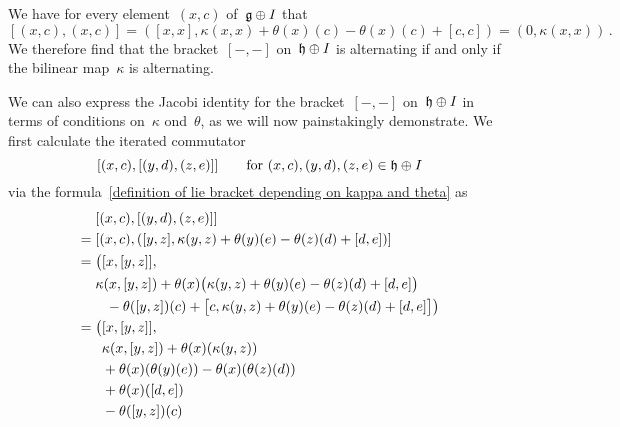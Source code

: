 \begin{fluff}
\begin{enumerate}
      We have for every element~$(x,c)$ of~$\mathfrak{g} \oplus I$ that
      \[
        [(x,c), (x,c)]
        =
        ( [x,x], \kappa(x,x) + \theta(x)(c) - \theta(x)(c) + [c,c] )
        =
        (0, \kappa(x,x) ) \,.
      \]
      We therefore find that the bracket~$[-,-]$ on~$\mathfrak{h} \oplus I$ is alternating if and only if the bilinear map~$\kappa$ is alternating.

      We can also express the Jacobi identity for the bracket~$[-,-]$ on~$\mathfrak{h} \oplus I$ in terms of conditions on~$\kappa$ ond~$\theta$, as we will now painstakingly demonstrate.
      We first calculate the iterated commutator
      \[
        [(x,c), [(y,d), (z,e)]]
        \qquad
        \text{for~$(x,c), (y,d), (z,e) \in \mathfrak{h} \oplus I$}
      \]
      via the formula~\eqref{definition of lie bracket depending on kappa and theta} as
      \begin{align}
        {}&
        [(x,c), [(y,d), (z,e)]]
        \notag
        \\
        ={}&
        [(x,c), ([y,z], \kappa(y,z) + \theta(y)(e) - \theta(z)(d) + [d,e])]
        \notag
        \\
        ={}&
        \bigl(
          [x, [y, z]], 
        \notag
        \\
        {}&
          \kappa( x, [y, z] )
          + \theta(x)
            \bigl(
              \kappa(y,z) + \theta(y)(e) - \theta(z)(d) + [d,e]
            \bigr)
        \notag
        \\
        {}&
        \hphantom{\biggl(}
          - \theta([y,z])(c)
          + \bigl[
              c,
              \kappa(y,z) + \theta(y)(e) - \theta(z)(d) + [d,e]
            \bigr]
        \bigr)
        \notag
        \\
        ={}&
        \smash{\bigl(}
          [x, [y, z]],
        \notag
        \\
        {}&
        \hphantom{\bigl(}
          \kappa( x, [y, z] )
          + \theta(x)( \kappa(y,z) )
        \label{ugly row 1}
        \\
        {}&
        \hphantom{\bigl(}
          + \theta(x)( \theta(y)(e) )
          - \theta(x)( \theta(z)(d) )
        \label{ugly row 2}
        \\
        {}&
        \hphantom{\bigl(}
          + \theta(x)( [d,e] )
        \label{ugly row 3}
        \\
        {}&
        \hphantom{\bigl(}
          - \theta( [y,z] )(c)
        \label{ugly row 4}

\end{align}
\end{enumerate}
\end{fluff}
